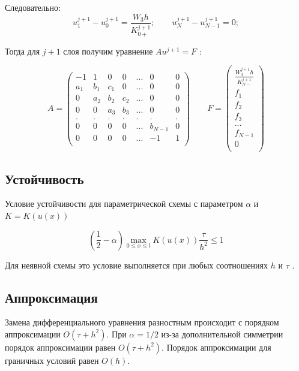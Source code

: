 \documentclass[a4paper,12pt]{article}
\begin{document}
Следовательно:
\begin{equation}
u_1^{j+1} - u_0^{j+1} = \frac{W_3h}{K_{0+}^{j+1}}; \qquad
u_N^{j+1} - u_{N-1}^{j+1} = 0;
\end{equation}

\newpage
Тогда для \(j+1\) слоя получим уравнение \(Au^{j+1} = F\) :


\begin{displaymath}
 A = \left( \begin{array}{ccccccc}
-1 & 1 & 0 & 0 & ... & 0 & 0 \\
a_1 & b_1 & c_1 & 0 & ... & 0 & 0 \\
0 & a_2 & b_2 & c_2 & ... & 0 & 0 \\
0 & 0 & a_3 & b_3 & ... & 0 & 0 \\
. & . & . & . & . & . & . \\
0 & 0 & 0 & 0 & ... & b_{N-1} & 0 \\
0 & 0 & 0 & 0 & ... & -1 & 1 \\
\end{array}
\right)  \qquad
 F = \left( \begin{array}{c}
\frac{W_3^{j+1}h}{K_{N-}^{j+1}} \\
f_1 \\
f_2 \\
f_3 \\
... \\
f_{N-1} \\
0 \\
\end{array}
\right) 
\end{displaymath}

\subsection{Устойчивость}
Условие устойчивости для параметрической схемы с параметром $\alpha$ и \(K = K(u(x))\)

\begin{equation}
(\frac{1}{2} - \alpha)\max_{0\le x \le l}K(u(x))\frac{\tau}{h^2} \le 1
\end{equation}
 
Для неявной схемы это условие выполняется при любых соотношениях $h$ и $\tau$ .

\subsection{Аппроксимация}
Замена дифференциального уравнения разностным происходит с порядком аппроксимации $O(\tau + h^2)$. При  $\alpha = 1/2$ из-за дополнительной симметрии порядок аппроксимации равен $O(\tau + h^2)$. Порядок аппроксимации для граничных условий равен $O(h)$.
\end{document}
